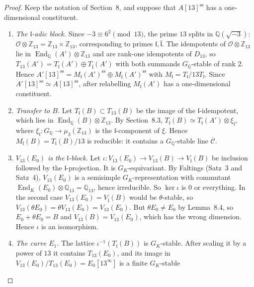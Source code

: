\documentclass[11pt]{article}
\newcommand{\Q}{\mathbb Q}
\newcommand{\Z}{\mathbb Z}
\DeclareMathOperator{\End}{End}
\begin{document}
\begin{proof}
Keep the notation of Section~8, and suppose that
\(A[13]^{\mathrm{ss}}\) has a one-dimensional constituent.
\begin{enumerate}
\item \emph{The \(\mathfrak l\)-adic block.} Since
\(-3\equiv6^2\pmod{13}\), the prime \(13\) splits in
\(\Q(\sqrt{-3})\): \(\mathcal O\otimes\Z_{13}=\Z_{13}\times\Z_{13}\),
corresponding to primes \(\mathfrak l,\bar{\mathfrak l}\). The
idempotents of \(\mathcal O\otimes\Z_{13}\) lie in
\(\End_{\Q}(A')\otimes\Z_{13}\) and are rank-one idempotents of
\(D_{13}\), so
\(T_{13}(A')=T_{\mathfrak l}(A')\oplus T_{\bar{\mathfrak l}}(A')\) with
both summands \(G_{\Q}\)-stable of rank \(2\). Hence
\(A'[13]^{\mathrm{ss}}=M_{\mathfrak l}(A')^{\mathrm{ss}}\oplus
M_{\bar{\mathfrak l}}(A')^{\mathrm{ss}}\) with
\(M_{\mathfrak l}=T_{\mathfrak l}/13T_{\mathfrak l}\). Since
\(A'[13]^{\mathrm{ss}}\simeq A[13]^{\mathrm{ss}}\), after relabelling
\(M_{\mathfrak l}(A')\) has a one-dimensional constituent.
\item \emph{Transfer to \(B\).} Let \(T_{\mathfrak l}(B)\subset
T_{13}(B)\) be the image of the \(\mathfrak l\)-idempotent, which lies
in \(\End_{\Q}(B)\otimes\Z_{13}\). By Section~8.3,
\(T_{\mathfrak l}(B)\simeq T_{\mathfrak l}(A')\otimes\xi_{\mathfrak l}\),
where \(\xi_{\mathfrak l}:G_{\Q}\to\mu_3(\Z_{13})\) is the
\(\mathfrak l\)-component of \(\xi\). Hence
\(M_{\mathfrak l}(B)=T_{\mathfrak l}(B)/13\) is reducible: it contains
a \(G_{\Q}\)-stable line \(\overline{\mathcal C}\).
\item \emph{\(V_{13}(E_0)\) is the \(\mathfrak l\)-block.} Let
\(\iota:V_{13}(E_0)\to V_{13}(B)\to V_{\mathfrak l}(B)\) be inclusion
followed by the \(\mathfrak l\)-projection. It is \(G_K\)-equivariant.
By Faltings (Satz~3 and Satz~4), \(V_{13}(E_0)\) is a semisimple
\(G_K\)-representation with commutant
\(\End_K(E_0)\otimes\Q_{13}=\Q_{13}\), hence irreducible. So
\(\ker\iota\) is \(0\) or everything. In the second case
\(V_{13}(E_0)=V_{\bar{\mathfrak l}}(B)\) would be \(\theta\)-stable, so
\(V_{13}(\theta E_0)=\theta V_{13}(E_0)=V_{13}(E_0)\). But
\(\theta E_0\ne E_0\) by Lemma~8.4, so \(E_0+\theta E_0=B\) and
\(V_{13}(B)=V_{13}(E_0)\), which has the wrong dimension. Hence
\(\iota\) is an isomorphism.
\item \emph{The curve \(E_1\).} The lattice
\(\iota^{-1}(T_{\mathfrak l}(B))\) is \(G_K\)-stable. After scaling it
by a power of \(13\) it contains \(T_{13}(E_0)\), and its image in
\(V_{13}(E_0)/T_{13}(E_0)=E_0[13^\infty]\) is a finite \(G_K\)-stable

\end{enumerate}
\end{proof}
\end{document}
